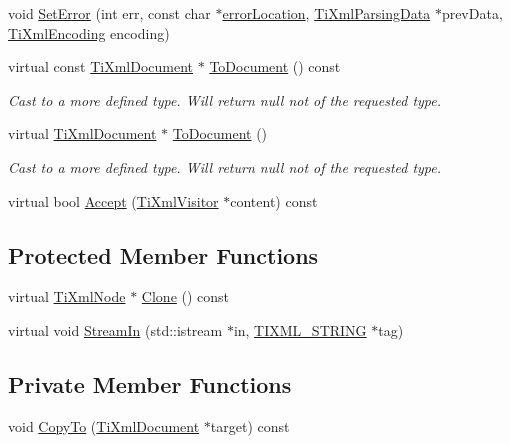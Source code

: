 \begin{DoxyCompactItemize}
void \hyperlink{class_ti_xml_document_a735c23e318597b920c94eae77fa206de}{Set\+Error} (int err, const char $\ast$\hyperlink{class_ti_xml_document_aa4030f989f1549f6b897147fc2851d1a}{error\+Location}, \hyperlink{class_ti_xml_parsing_data}{Ti\+Xml\+Parsing\+Data} $\ast$prev\+Data, \hyperlink{tinyxml_8h_a88d51847a13ee0f4b4d320d03d2c4d96}{Ti\+Xml\+Encoding} encoding)
\item 
virtual const \hyperlink{class_ti_xml_document}{Ti\+Xml\+Document} $\ast$ \hyperlink{class_ti_xml_document_a468e582640e3c4f740f7168d8b4a6e4a}{To\+Document} () const
\begin{DoxyCompactList}\small\item\em Cast to a more defined type. Will return null not of the requested type. \end{DoxyCompactList}\item 
virtual \hyperlink{class_ti_xml_document}{Ti\+Xml\+Document} $\ast$ \hyperlink{class_ti_xml_document_a1025d942a1f328fd742d545e37efdd42}{To\+Document} ()
\begin{DoxyCompactList}\small\item\em Cast to a more defined type. Will return null not of the requested type. \end{DoxyCompactList}\item 
virtual bool \hyperlink{class_ti_xml_document_a8ddd6eec722cbd25900bbac664909bac}{Accept} (\hyperlink{class_ti_xml_visitor}{Ti\+Xml\+Visitor} $\ast$content) const
\end{DoxyCompactItemize}
\subsection*{Protected Member Functions}
\begin{DoxyCompactItemize}
\item 
virtual \hyperlink{class_ti_xml_node}{Ti\+Xml\+Node} $\ast$ \hyperlink{class_ti_xml_document_a46a4dda6c56eb106d46d4046ae1e5353}{Clone} () const
\item 
virtual void \hyperlink{class_ti_xml_document_ab6d70b2c19e46aedb9903b3c3aa2a568}{Stream\+In} (std\+::istream $\ast$in, \hyperlink{tinyxml_8h_a92bada05fd84d9a0c9a5bbe53de26887}{T\+I\+X\+M\+L\+\_\+\+S\+T\+R\+I\+NG} $\ast$tag)
\end{DoxyCompactItemize}
\subsection*{Private Member Functions}
\begin{DoxyCompactItemize}
\item 
void \hyperlink{class_ti_xml_document_aa57c3b2209e540644ca3eb591f6da227}{Copy\+To} (\hyperlink{class_ti_xml_document}{Ti\+Xml\+Document} $\ast$target) const
\end{DoxyCompactItemize}

